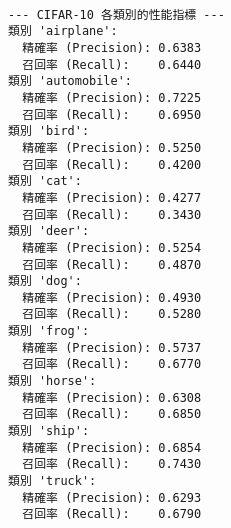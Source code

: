 \documentclass[11pt]{article}
\begin{document}
    \begin{Verbatim}[commandchars=\\\{\}]

--- CIFAR-10 各類別的性能指標 ---
類別 'airplane':
  精確率 (Precision): 0.6383
  召回率 (Recall):    0.6440
類別 'automobile':
  精確率 (Precision): 0.7225
  召回率 (Recall):    0.6950
類別 'bird':
  精確率 (Precision): 0.5250
  召回率 (Recall):    0.4200
類別 'cat':
  精確率 (Precision): 0.4277
  召回率 (Recall):    0.3430
類別 'deer':
  精確率 (Precision): 0.5254
  召回率 (Recall):    0.4870
類別 'dog':
  精確率 (Precision): 0.4930
  召回率 (Recall):    0.5280
類別 'frog':
  精確率 (Precision): 0.5737
  召回率 (Recall):    0.6770
類別 'horse':
  精確率 (Precision): 0.6308
  召回率 (Recall):    0.6850
類別 'ship':
  精確率 (Precision): 0.6854
  召回率 (Recall):    0.7430
類別 'truck':
  精確率 (Precision): 0.6293
  召回率 (Recall):    0.6790
    \end{Verbatim}
\end{document}

